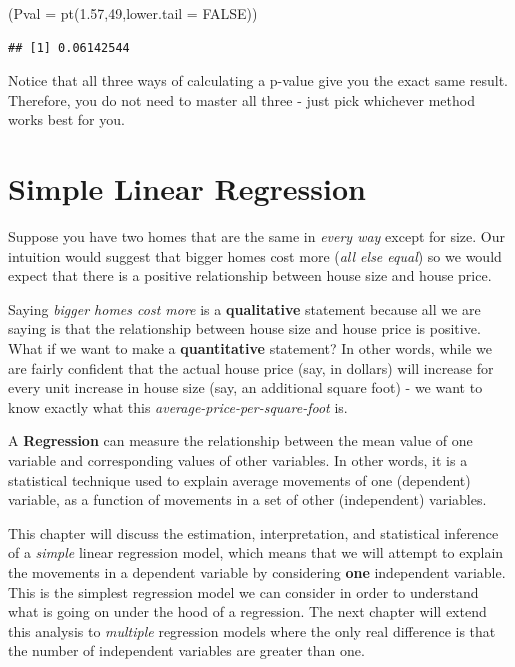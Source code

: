 \documentclass[
]{book}
\newenvironment{Shaded}{\begin{snugshade}}{\end{snugshade}}
\newcommand{\AttributeTok}[1]{\textcolor[rgb]{0.77,0.63,0.00}{#1}}
\newcommand{\ConstantTok}[1]{\textcolor[rgb]{0.00,0.00,0.00}{#1}}
\newcommand{\DecValTok}[1]{\textcolor[rgb]{0.00,0.00,0.81}{#1}}
\newcommand{\FloatTok}[1]{\textcolor[rgb]{0.00,0.00,0.81}{#1}}
\newcommand{\FunctionTok}[1]{\textcolor[rgb]{0.00,0.00,0.00}{#1}}
\newcommand{\NormalTok}[1]{#1}
\begin{document}
\begin{Shaded}
\begin{Highlighting}[]
\NormalTok{(}\AttributeTok{Pval =} \FunctionTok{pt}\NormalTok{(}\FloatTok{1.57}\NormalTok{,}\DecValTok{49}\NormalTok{,}\AttributeTok{lower.tail =} \ConstantTok{FALSE}\NormalTok{))}
\end{Highlighting}
\end{Shaded}

\begin{verbatim}
## [1] 0.06142544
\end{verbatim}

Notice that all three ways of calculating a p-value give you the exact same result. Therefore, you do not need to master all three - just pick whichever method works best for you.

\hypertarget{SLR}{%
\chapter{Simple Linear Regression}\label{SLR}}

Suppose you have two homes that are the same in \emph{every way} except for size. Our intuition would suggest that bigger homes cost more (\emph{all else equal}) so we would expect that there is a positive relationship between house size and house price.

Saying \emph{bigger homes cost more} is a \textbf{qualitative} statement because all we are saying is that the relationship between house size and house price is positive. What if we want to make a \textbf{quantitative} statement? In other words, while we are fairly confident that the actual house price (say, in dollars) will increase for every unit increase in house size (say, an additional square foot) - we want to know exactly what this \emph{average-price-per-square-foot} is.

A \textbf{Regression} can measure the relationship between the mean value of one variable and corresponding values of other variables. In other words, it is a statistical technique used to explain average movements of one (dependent) variable, as a function of movements in a set of other (independent) variables.

This chapter will discuss the estimation, interpretation, and statistical inference of a \emph{simple} linear regression model, which means that we will attempt to explain the movements in a dependent variable by considering \textbf{one} independent variable. This is the simplest regression model we can consider in order to understand what is going on under the hood of a regression. The next chapter will extend this analysis to \emph{multiple} regression models where the only real difference is that the number of independent variables are greater than one.
\end{document}
